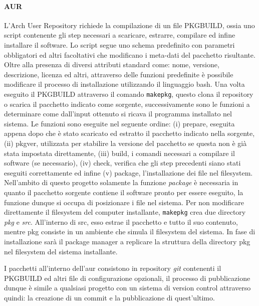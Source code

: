 \paragraph{AUR} L'Arch User Repository richiede la compilazione di un file PKGBUILD, ossia uno script contenente gli step necessari a scaricare, estrarre, compilare ed infine installare il software. Lo script segue uno schema predefinito con parametri obbligatori ed altri facoltativi che modificano i meta-dati del pacchetto risultante. Oltre alla presenza di diversi attributi standard come: nome, versione, descrizione, licenza ed altri, attraverso delle funzioni predefinite è possibile modificare il processo di installazione utilizzando il linguaggio bash. Una volta eseguito il PKGBUILD attraverso il comando \texttt{makepkg}, questo clona il repository o scarica il pacchetto indicato come sorgente, successivamente sono le funzioni a determinare come dall'input ottenuto si ricava il programma installato nel sistema.
Le funzioni sono eseguite nel seguente ordine: (i) prepare, eseguita appena dopo che è stato scaricato ed estratto il pacchetto indicato nella sorgente, (ii) pkgver, utilizzata per stabilire la versione del pacchetto se questa non è già stata impostata direttamente, (iii) build, i comandi necessari a compilare il software (se necessario), (iv) check, verifica che gli step precedenti siano stati eseguiti correttamente ed infine (v) package, l'installazione dei file nel filesystem. Nell'ambito di questo progetto solamente la funzione \textit{package} è necessaria in quanto il pacchetto sorgente contiene il software pronto per essere eseguito, la funzione dunque si occupa di posizionare i file nel sistema.
Per non modificare direttamente il filesystem del computer installante, \texttt{makepkg} crea due directory \textit{pkg} e \textit{src}. All'interno di src, esso estrae il pacchetto e tutto il suo contenuto, mentre pkg consiste in un ambiente che simula il filesystem del sistema. In fase di installazione sarà il package manager a replicare la struttura della directory pkg nel filesystem del sistema installante.

I pacchetti all'interno dell'\ac{aur} consistono in repository \textit{git} contenenti il PKGBUILD ed altri file di configurazione opzionali, il processo di pubblicazione dunque è simile a qualsiasi progetto con un sistema di version control attraverso quindi: la creazione di un commit e la pubblicazione di quest'ultimo.

